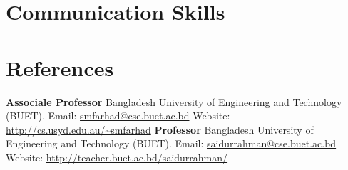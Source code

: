 \documentclass[11pt,a4paper,sans]{moderncv}
\begin{document}
\section{Communication Skills}




\section{References}
{
\textbf{Associale Professor\newline}
Bangladesh University of Engineering and Technology (BUET).\newline
Email: \url{smfarhad@cse.buet.ac.bd} \newline
Website: \url{http://cs.usyd.edu.au/~smfarhad}
}
{
\textbf{Professor\newline}
Bangladesh University of Engineering and Technology (BUET).\newline
Email: \url{saidurrahman@cse.buet.ac.bd} \newline
Website: \url{http://teacher.buet.ac.bd/saidurrahman/}
}
\end{document}
